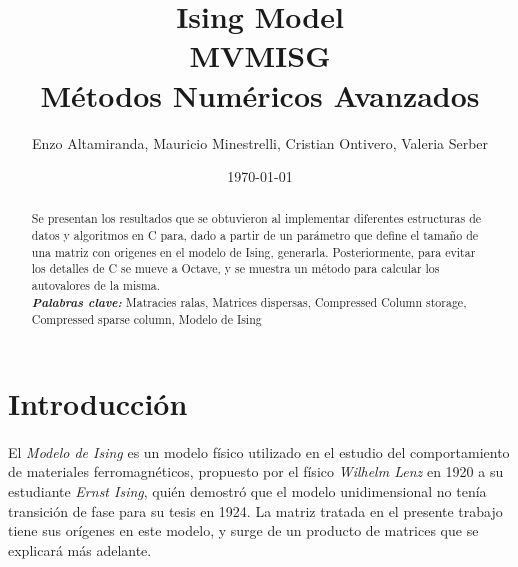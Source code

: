 \documentclass[a4paper,11pt]{article}
\title{Ising Model \\
MVMISG  \\ M\'etodos Num\'ericos Avanzados}
\author{Enzo Altamiranda, Mauricio Minestrelli, Cristian Ontivero, Valeria Serber}
\date{\today}
\providecommand{\keywords}[1]{\textbf{\textit{Palabras clave:}} #1}
\begin{document}
\maketitle
\thispagestyle{empty}
\vspace{3cm}

\renewcommand{\abstractname}{Resumen}
\begin{abstract}
Se presentan los resultados que se obtuvieron al implementar diferentes
estructuras de datos y algoritmos en C para, dado a partir de un par\'ametro
que define el tamaño de una matriz con origenes en el modelo de Ising,
generarla.  Posteriormente, para evitar los detalles de C se mueve a Octave,
y se muestra un m\'etodo para calcular los autovalores de la misma.\\[5 pt]
\keywords{Matracies ralas, Matrices dispersas, Compressed Column storage,  Compressed sparse column, Modelo de Ising}
\end{abstract}
\section{Introducci\'on}

\paragraph{}
El \emph{Modelo de Ising} es un modelo f\'isico utilizado en el estudio del
comportamiento de materiales ferromagn\'eticos, propuesto por el f\'isico
\emph{Wilhelm Lenz} en 1920 a su estudiante \emph{Ernst Ising}, qui\'en
demostr\'o que el modelo unidimensional no ten\'ia transici\'on de fase para su
tesis en 1924. La matriz tratada en el presente trabajo tiene sus or\'igenes en
este modelo, y surge de un producto de matrices que se explicar\'a m\'as
adelante.
\end{document}
